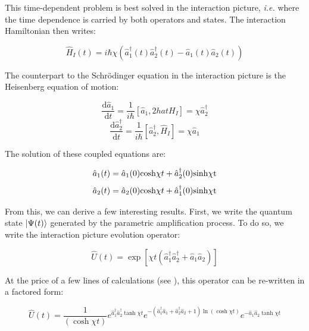 This time-dependent problem is best solved in the interaction picture, {\it i.e.} where the time dependence is carried by both operators and states. The interaction Hamiltonian then writes:

\begin{equation}
    \hat{H}_I(t)=i \hbar \chi (\hat{a}_1^{\dagger}(t)  \hat{a}_2^{\dagger}(t) - \hat{a}_1(t) \hat{a}_2(t))
\end{equation}

\noindent The counterpart to the Schrödinger equation in the interaction picture is the Heisenberg equation of motion:

\begin{equation}
    \frac{\mathrm{d}\hat{a}_1}{\mathrm{d}t}= \frac{1}{i\hbar} [\hat{a}_1,2hat{H}_I]=\chi \hat{a}_2^{\dagger}
\end{equation}
\begin{equation}
    \frac{\mathrm{d}\hat{a}_2^{\dagger}}{\mathrm{d}t}= \frac{1}{i\hbar} [\hat{a}_2^{\dagger},\hat{H}_I]=\chi \hat{a}_1
\end{equation}

\noindent The solution of these coupled equations are:

\begin{equation}
    \hat{a}_1(t)=\hat{a}_1(0) \mathrm{cosh} \chi t + \hat{a}_2^{\dagger}(0) \rm{sinh} \chi t
    \label{eq:a1}
\end{equation}
\begin{equation}
    \hat{a}_2(t)=\hat{a}_2(0) \mathrm{cosh} \chi t + \hat{a}_1^{\dagger}(0) \rm{sinh} \chi t
    \label{eq:a2}
\end{equation}

\noindent From this, we can derive a few interesting results. First, we write the quantum state $\ket{\Psi(t)}$ generated by the parametric amplification process. To do so, we write the interaction picture evolution operator:

\begin{equation}
    \hat{U}(t)=\exp \left[\chi t\left(\hat{a}_{1}^{\dagger} \hat{a}_{2}^{\dagger}+\hat{a}_{1} \hat{a}_{2}\right)\right]
\end{equation}

\noindent At the price of a few lines of calculations (see \cite{schumaker1985new}), this operator can be re-written in a factored form:

\begin{equation}
    \hat{U}(t)=\frac{1}{(\cosh \chi t)} e^{\hat{a}_{1}^{\dagger} \hat{a}_{2}^{\dagger} \tanh \chi t} e^{-\left(\hat{a}_{1}^{\dagger} \hat{a}_{1}+\hat{a}_{2}^{\dagger} \hat{a}_{2}+1\right) \ln (\cosh \chi t)} e^{-\hat{a}_{1} \hat{a}_{2} \tanh \chi t}
\end{equation}

